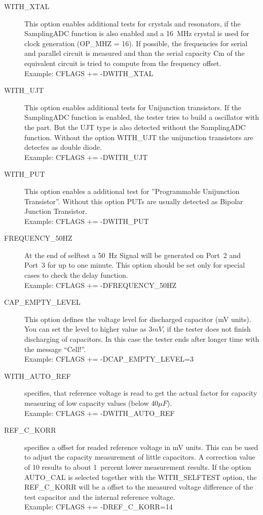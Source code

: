 \begin{description}
  \item[WITH\_XTAL]
This option enables additional tests for crystals and resonators, if the SamplingADC function is also enabled and
a 16~MHz crystal is used for clock generation (OP\_MHZ = 16).
If possible, the frequencies for serial and parallel circuit is measured and than the serial capacity Cm of the
equivalent circuit is tried to compute from the frequency offset.\\
Example: CFLAGS += -DWITH\_XTAL

  \item[WITH\_UJT]
This option enables additional tests for  Unijunction transistors. 
If the SamplingADC function is enabled, the tester tries to build a oscillator with the part.
But the UJT type is also detected without the SamplingADC function.
Without the option WITH\_UJT the unijunction transistors are detectes as double diode.\\
Example: CFLAGS += -DWITH\_UJT

  \item[WITH\_PUT]
This option enables a additional test for ''Programmable Unijunction Transistor''.
Without this option PUTs are usually detected as Bipolar Junction Transistor.\\
Example: CFLAGS += -DWITH\_PUT

  \item[FREQUENCY\_50HZ] At the end of selftest a 50~Hz Signal will be generated on Port~2 and Port~3 for up to one minute.
 This option should be set only for special cases to check the delay function.\\
Example: CFLAGS += -DFREQUENCY\_50HZ

  \item[CAP\_EMPTY\_LEVEL]  This option defines the voltage level for discharged capacitor (mV units).
You can set the level to higher value as \(3mV\), if the tester does not finish discharging of capacitors.
In this case the tester ends after longer time with the message ``Cell!''.\\
Example: CFLAGS += -DCAP\_EMPTY\_LEVEL=3

  \item[WITH\_AUTO\_REF] specifies, that reference voltage is read to get the actual factor for capacity measuring of low capacity values (below \(40\mu F\)).\\
Example:  CFLAGS += -DWITH\_AUTO\_REF

  \item[REF\_C\_KORR] specifies a offset for readed reference voltage in mV units.
This can be used to adjust the capacity measurement of little capacitors.
A correction value of 10 results to about 1~percent lower measurement results.
If the option AUTO\_CAL is selected together with the WITH\_SELFTEST option, the REF\_C\_KORR will be
a offset to the measured voltage difference of the test capacitor and the internal reference voltage.\\
Example:  CFLAGS += -DREF\_C\_KORR=14


\end{description}
